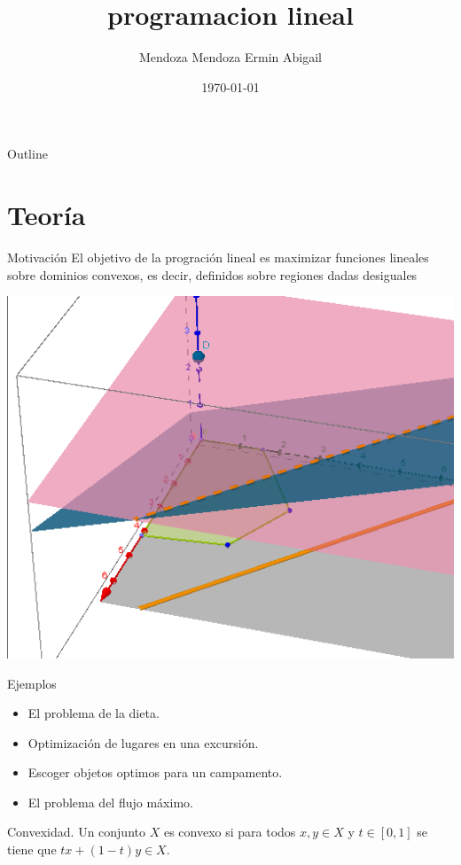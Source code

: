 \documentclass[presentation]{beamer}
\author{Mendoza Mendoza Ermin Abigail}
\date{\today}
\title{programacion lineal}
\begin{document}
\maketitle
\begin{frame}{Outline}
\tableofcontents
\end{frame}


\section{Teoría}
\label{sec:org332de45}
\begin{frame}[label={sec:org4930396}]{Motivación}
El objetivo de la progración lineal es maximizar funciones lineales
sobre dominios convexos, es decir, definidos sobre regiones dadas
desiguales

\begin{center}
\includegraphics[width=.9\linewidth]{imagen.png}
\end{center}
\end{frame}

\begin{frame}[label={sec:org10d6c49}]{Ejemplos}
\begin{itemize}
\item El problema de la dieta.
\item Optimización de lugares en una excursión.
\item Escoger objetos optimos para un campamento.
\item El problema del flujo máximo.
\end{itemize}
\end{frame}


\begin{frame}[label={sec:orgbac08ff}]{Convexidad.}
Un conjunto \(X\) es \alert{convexo} si para todos \(x,y\in X\) y \(t\in [0,1]\) se tiene que  \(tx+(1-t)y\in X\).
\end{frame}
\end{document}
